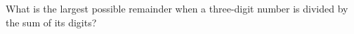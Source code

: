 What is the largest possible remainder when a three-digit number is divided by the sum of its digits?
